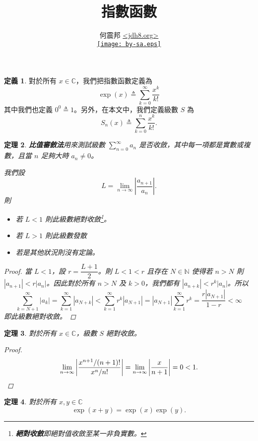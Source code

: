 \documentclass[a4paper]{article}
\title{指數函數}
\author{何震邦 \href{http://jdh8.org/}{\textless jdh8.org\textgreater}\\
    \href{http://creativecommons.org/licenses/by-sa/3.0/tw/deed.zh\textunderscore TW}{\texttt{[image: by-sa.eps]}}}
\newcommand  {\N}{\mathbb N}
\renewcommand{\C}{\mathbb C}
\theoremstyle{plain}
\newtheorem{theorem}{定理}
\theoremstyle{definition}
\newtheorem{definition}[theorem]{定義}
\theoremstyle{remark}
\begin{document}
\begin{CJK}{UTF8}{bsmi}
\maketitle

\begin{definition} \label{def:exp}
  對於所有 $x \in \C$，我們把指數函數定義為
  \[\exp(x) \triangleq \sum_{k=0}^{\infty} \frac{x^k}{k!}\]
  其中我們也定義 $0^0 \triangleq 1$。另外，在本文中，我們定義級數 $S$ 為
  \[S_n(x) \triangleq \sum_{k=0}^n \frac{x^k}{k!}.\]
\end{definition}

\begin{theorem}
  \textbf{比值審斂法}用來測試級數 $\displaystyle \sum_{n=0}^\infty a_n$ 是否收斂，其中每一項都是實數或複數，且當 $n$
  足夠大時 $a_n \ne 0$。

  我們設
  \[L = \lim_{n \to \infty} \left| \frac{a_{n+1}}{a_n} \right|.\]
  則
  \begin{itemize}
    \item 若 $L < 1$ 則此級數絕對收斂\footnote{\textbf{絕對收斂}即絕對值收斂至某一非負實數。}。
    \item 若 $L > 1$ 則此級數發散
    \item 若是其他狀況則沒有定論。
  \end{itemize}

  \begin{proof}
    當 $L < 1$，設 $r = \dfrac{L+1}{2}$。則 $L < 1 < r$ 且存在 $N \in \N$ 使得若 $n > N$ 則 $|a_{n+1}| < r \left| a_n
    \right|$。因此對於所有 $n > N$ 及 $k > 0$，我們都有 $|a_{n+k}| < r^k \left| a_n \right|$。所以
    \[\sum_{k=N+1}^\infty \left| a_k \right| = \sum_{k=1}^\infty \left| a_{N+k} \right|
      < \sum_{k=1}^\infty r^k \left| a_{N+1} \right| = |a_{N+1}| \sum_{k=1}^\infty r^k
      = \frac{r \left| a_{N+1} \right|}{1-r} < \infty\]
    即此級數絕對收斂。
  \end{proof}
\end{theorem}

\begin{theorem}
  對於所有 $x \in \C$，級數 $S$ 絕對收斂。
  \begin{proof}
    \[\lim_{n \to \infty} \left| \frac{x^{n+1} / (n+1)!}{x^n / n!} \right| = \lim_{n \to \infty} \left| \frac{x}{n+1}
    \right| = 0 < 1. \qedhere\]
  \end{proof}
\end{theorem}

\begin{theorem}
  對於所有 $x,y \in \C$
  \[\exp(x+y) = \exp(x) \exp(y).\]


\end{theorem}
\end{CJK}
\end{document}

